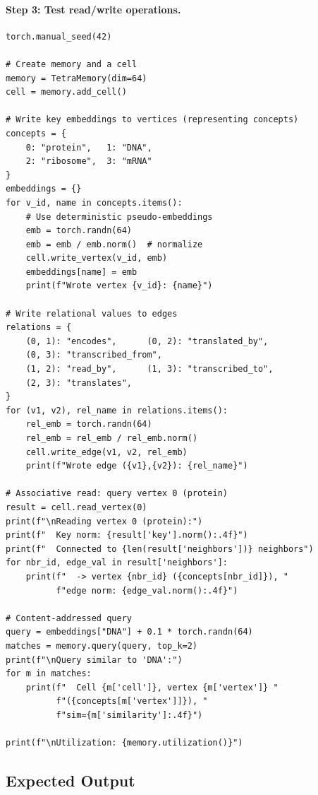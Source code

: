 \paragraph{Step 3: Test read/write operations.}

\begin{lstlisting}[style=dogmapython, caption={Lab 4: Testing TetraMemory.}]
torch.manual_seed(42)

# Create memory and a cell
memory = TetraMemory(dim=64)
cell = memory.add_cell()

# Write key embeddings to vertices (representing concepts)
concepts = {
    0: "protein",   1: "DNA",
    2: "ribosome",  3: "mRNA"
}
embeddings = {}
for v_id, name in concepts.items():
    # Use deterministic pseudo-embeddings
    emb = torch.randn(64)
    emb = emb / emb.norm()  # normalize
    cell.write_vertex(v_id, emb)
    embeddings[name] = emb
    print(f"Wrote vertex {v_id}: {name}")

# Write relational values to edges
relations = {
    (0, 1): "encodes",      (0, 2): "translated_by",
    (0, 3): "transcribed_from",
    (1, 2): "read_by",      (1, 3): "transcribed_to",
    (2, 3): "translates",
}
for (v1, v2), rel_name in relations.items():
    rel_emb = torch.randn(64)
    rel_emb = rel_emb / rel_emb.norm()
    cell.write_edge(v1, v2, rel_emb)
    print(f"Wrote edge ({v1},{v2}): {rel_name}")

# Associative read: query vertex 0 (protein)
result = cell.read_vertex(0)
print(f"\nReading vertex 0 (protein):")
print(f"  Key norm: {result['key'].norm():.4f}")
print(f"  Connected to {len(result['neighbors'])} neighbors")
for nbr_id, edge_val in result['neighbors']:
    print(f"  -> vertex {nbr_id} ({concepts[nbr_id]}), "
          f"edge norm: {edge_val.norm():.4f}")

# Content-addressed query
query = embeddings["DNA"] + 0.1 * torch.randn(64)
matches = memory.query(query, top_k=2)
print(f"\nQuery similar to 'DNA':")
for m in matches:
    print(f"  Cell {m['cell']}, vertex {m['vertex']} "
          f"({concepts[m['vertex']]}), "
          f"sim={m['similarity']:.4f}")

print(f"\nUtilization: {memory.utilization()}")
\end{lstlisting}

\subsection{Expected Output}

